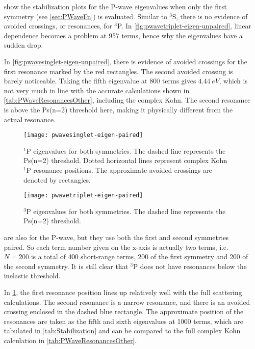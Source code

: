 \documentclass[Dissertation.tex]{subfiles}
\begin{document}
 show the stabilization plots for the P-wave eigenvalues when only the first symmetry (see \cref{sec:PWaveFn}) is evaluated. Similar to $^3$S, there is no evidence of avoided crossings, or resonances, for $^3$P. In \cref{fig:pwavetriplet-eigen-unpaired}, linear dependence becomes a problem at 957 terms, hence why the eigenvalues have a sudden drop.

In \cref{fig:pwavesinglet-eigen-unpaired}, there is evidence of avoided crossings for the first resonance marked by the red rectangles. The second avoided crossing is barely noticeable. Taking the fifth eigenvalue at 800 terms gives $\SI{4.44}{eV}$, which is not very much in line with the accurate calculations shown in \cref{tab:PWaveResonancesOther}, including the complex Kohn. The second resonance is above the Ps(n=2) threshold here, making it physically different from the actual resonance.

\begin{figure}[H]
	\centering
	\texttt{[image: pwavesinglet-eigen-paired]}
	\caption[$^1$P eigenvalues for both symmetries]{$^1$P eigenvalues for both symmetries. The dashed line represents the Ps(n=2) threshold. Dotted horizontal lines represent complex Kohn $^1$P resonance positions. The approximate avoided crossings are denoted by rectangles.}
	\label{fig:pwavesinglet-eigen-paired}
\end{figure}

\begin{figure}[H]
	\centering
	\texttt{[image: pwavetriplet-eigen-paired]}
	\caption[$^3$P eigenvalues for both symmetries]{$^3$P eigenvalues for both symmetries. The dashed line represents the Ps(n=2) threshold.}
	\label{fig:pwavetriplet-eigen-paired}
\end{figure}

 are also for the P-wave, but they use both the first and second symmetries paired. So each term number given on the x-axis is actually two terms, i.e. $N = 200$ is a total of 400 short-range terms, 200 of the first symmetry and 200 of the second symmetry. It is still clear that $^3$P does not have resonances below the inelastic threshold.

In \cref{fig:pwavesinglet-eigen-paired}, the first resonance position lines up relatively well with the full scattering calculations. The second resonance is a narrow resonance, and there is an avoided crossing enclosed in the dashed blue rectangle. The approximate position of the resonances are taken as the fifth and sixth eigenvalues at 1000 terms, which are tabulated in \cref{tab:Stabilization} and can be compared to the full complex Kohn calculation in \cref{tab:PWaveResonancesOther}.
\end{document}
